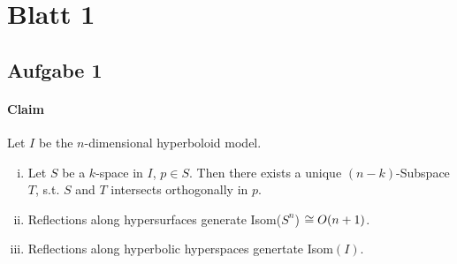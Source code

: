 \documentclass{book}
\begin{document}
\section{Blatt 1}
\subsection{Aufgabe 1}
\paragraph{Claim}
Let $I$ be the $n$-dimensional hyperboloid model.
\begin{enumerate}[(i)]
	\item Let $S$ be a $k$-space in $I$, $p \in S$. Then there exists a unique $(n-k)$-Subspace $T$, s.t. $S$ and $T$ intersects orthogonally in $p$.
	\item Reflections along hypersurfaces generate Isom($S^n$) $\overset{}{\cong} O(n+1)$.
	\item Reflections along hyperbolic hyperspaces genertate Isom$(I)$.
\end{enumerate}
\end{document}
